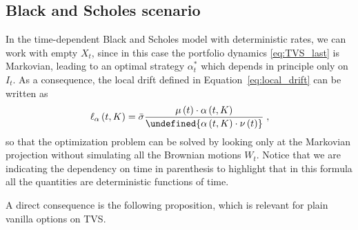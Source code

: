 \documentclass[runningheads]{m2ef}
\let\norm\undefined %
\DeclarePairedDelimiter\norm{\lVert}{\rVert}
\begin{document}
	\subsection{Black and Scholes scenario}\label{subsec:BS_model}
	In the time-dependent Black and Scholes model with deterministic rates, we can work with empty $X_t$, since in this case the portfolio dynamics \eqref{eq:TVS_last} is Markovian, leading to an optimal strategy $\alpha_t^*$ which depends in principle only on $I_t$. As a consequence, the local drift defined in Equation~\eqref{eq:local_drift} can be written as
	\begin{equation}
		\ell_\alpha \left(t,K\right) = \bar{\sigma}   \frac{\mu\left(t\right) \cdot \alpha\left(t,K\right)}{\norm{\alpha\left(t,K\right) \cdot \nu\left(t\right)}} \; ,  
	\end{equation}
	so that the optimization problem can be solved by looking only at the Markovian projection without simulating all the Brownian motions $W_t$. Notice that we are indicating the dependency on time in parenthesis to highlight that in this formula all the quantities are deterministic functions of time.

	A direct consequence is the following proposition, which is relevant for plain vanilla options on TVS.
\end{document}
